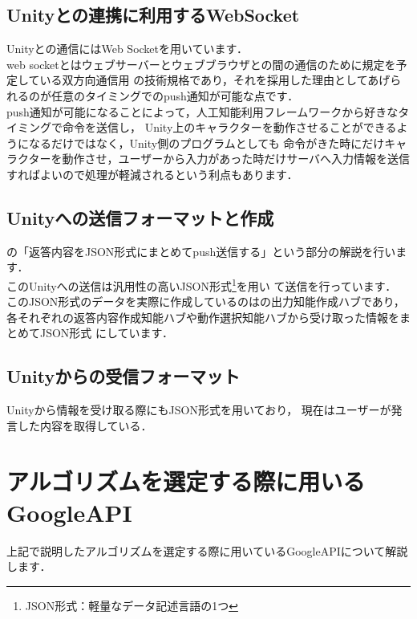 \subsection{Unityとの連携に利用するWebSocket}
Unityとの通信にはWeb Socketを用いています．\\

web socketとはウェブサーバーとウェブブラウザとの間の通信のために規定を予定している双方向通信用
の技術規格であり，それを採用した理由としてあげられるのが任意のタイミングでのpush通知が可能な点です．\\

push通知が可能になることによって，人工知能利用フレームワークから好きなタイミングで命令を送信し，
Unity上のキャラクターを動作させることができるようになるだけではなく，Unity側のプログラムとしても
命令がきた時にだけキャラクターを動作させ，ユーザーから入力があった時だけサーバへ入力情報を送信
すればよいので処理が軽減されるという利点もあります．\\

\subsection{Unityへの送信フォーマットと作成}
の「返答内容をJSON形式にまとめてpush送信する」という部分の解説を行います．\\
このUnityへの送信は汎用性の高いJSON形式\footnote{JSON形式：軽量なデータ記述言語の1つ}を用い
て送信を行っています．\\

このJSON形式のデータを実際に作成しているのはの出力知能作成ハブであり，
各それぞれの返答内容作成知能ハブや動作選択知能ハブから受け取った情報をまとめてJSON形式
にしています．\\


\subsection{Unityからの受信フォーマット}
Unityから情報を受け取る際にもJSON形式を用いており，
現在はユーザーが発言した内容を取得している．\\


\newpage

\section{アルゴリズムを選定する際に用いるGoogleAPI}
上記で説明したアルゴリズムを選定する際に用いているGoogleAPIについて解説します．\\

